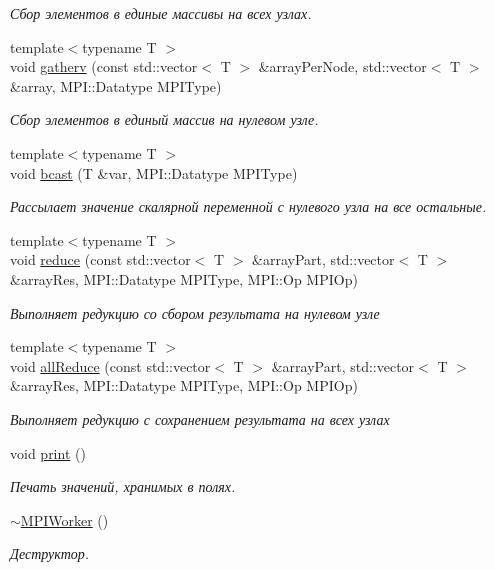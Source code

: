 \begin{DoxyCompactItemize}
\begin{DoxyCompactList}\small\item\em Сбор элементов в единые массивы на всех узлах. \end{DoxyCompactList}\item 
{\footnotesize template$<$typename T $>$ }\\void \hyperlink{classmpiworker_1_1MPIWorker_aff6b4d55cb55caa37c9a0cb08b3c5661}{gatherv} (const std\-::vector$<$ T $>$ \&array\-Per\-Node, std\-::vector$<$ T $>$ \&array, M\-P\-I\-::\-Datatype M\-P\-I\-Type)
\begin{DoxyCompactList}\small\item\em Сбор элементов в единый массив на нулевом узле. \end{DoxyCompactList}\item 
{\footnotesize template$<$typename T $>$ }\\void \hyperlink{classmpiworker_1_1MPIWorker_ae22bafa8bd4d6515e5b91ef95518c87d}{bcast} (T \&var, M\-P\-I\-::\-Datatype M\-P\-I\-Type)
\begin{DoxyCompactList}\small\item\em Рассылает значение скалярной переменной с нулевого узла на все остальные. \end{DoxyCompactList}\item 
{\footnotesize template$<$typename T $>$ }\\void \hyperlink{classmpiworker_1_1MPIWorker_a813f812267563ac5000fdee9393ddfff}{reduce} (const std\-::vector$<$ T $>$ \&array\-Part, std\-::vector$<$ T $>$ \&array\-Res, M\-P\-I\-::\-Datatype M\-P\-I\-Type, M\-P\-I\-::\-Op M\-P\-I\-Op)
\begin{DoxyCompactList}\small\item\em Выполняет редукцию со сбором результата на нулевом узле \end{DoxyCompactList}\item 
{\footnotesize template$<$typename T $>$ }\\void \hyperlink{classmpiworker_1_1MPIWorker_ac612f81da30253de9e6c9fbc8eda7427}{all\-Reduce} (const std\-::vector$<$ T $>$ \&array\-Part, std\-::vector$<$ T $>$ \&array\-Res, M\-P\-I\-::\-Datatype M\-P\-I\-Type, M\-P\-I\-::\-Op M\-P\-I\-Op)
\begin{DoxyCompactList}\small\item\em Выполняет редукцию с сохранением результата на всех узлах \end{DoxyCompactList}\item 
void \hyperlink{classmpiworker_1_1MPIWorker_ab9f20357773fe10fbe3bc6d92754d4e0}{print} ()
\begin{DoxyCompactList}\small\item\em Печать значений, хранимых в полях. \end{DoxyCompactList}\item 
\hyperlink{classmpiworker_1_1MPIWorker_aed998fa1c473d6bc98150bb94dd8bb58}{$\sim$\-M\-P\-I\-Worker} ()
\begin{DoxyCompactList}\small\item\em Деструктор. \end{DoxyCompactList}\end{DoxyCompactItemize}


